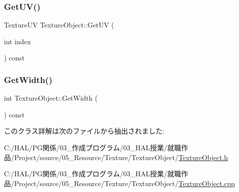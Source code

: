 \mbox{\label{class_texture_object_a51b8a2723302c2d38624a62f9205c4bb}} 
\subsubsection{\texorpdfstring{Get\+U\+V()}{GetUV()}}
{\footnotesize\ttfamily Texture\+UV Texture\+Object\+::\+Get\+UV (\begin{DoxyParamCaption}\item[{int}]{index }\end{DoxyParamCaption}) const\hspace{0.3cm}{\ttfamily [inline]}}

\mbox{\label{class_texture_object_a72c079770e7e4355b6481d28a0a472ac}} 
\subsubsection{\texorpdfstring{Get\+Width()}{GetWidth()}}
{\footnotesize\ttfamily int Texture\+Object\+::\+Get\+Width (\begin{DoxyParamCaption}{ }\end{DoxyParamCaption}) const\hspace{0.3cm}{\ttfamily [inline]}}



このクラス詳解は次のファイルから抽出されました\+:\begin{DoxyCompactItemize}
\item 
C\+:/\+H\+A\+L/\+P\+G関係/03\+\_\+作成プログラム/03\+\_\+\+H\+A\+L授業/就職作品/\+Project/source/05\+\_\+\+Resource/\+Texture/\+Texture\+Object/\mbox{\hyperlink{_texture_object_8h}{Texture\+Object.\+h}}\item 
C\+:/\+H\+A\+L/\+P\+G関係/03\+\_\+作成プログラム/03\+\_\+\+H\+A\+L授業/就職作品/\+Project/source/05\+\_\+\+Resource/\+Texture/\+Texture\+Object/\mbox{\hyperlink{_texture_object_8cpp}{Texture\+Object.\+cpp}}\end{DoxyCompactItemize}
